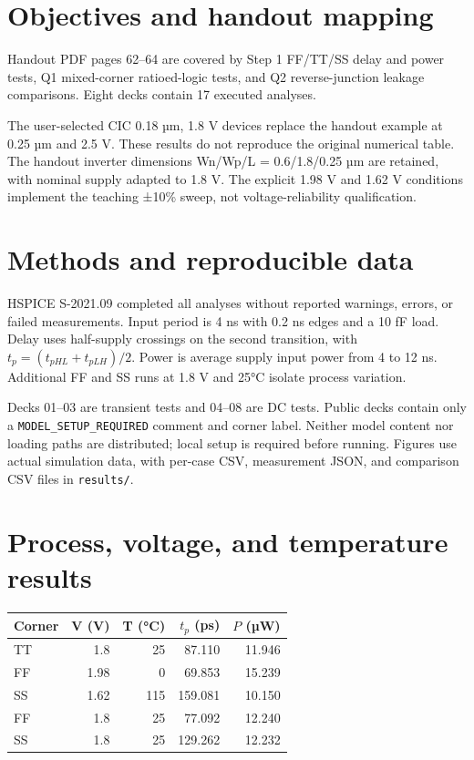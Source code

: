 \section{Objectives and handout mapping}

Handout PDF pages 62--64 are covered by Step 1 FF/TT/SS delay and power tests, Q1 mixed-corner ratioed-logic tests, and Q2 reverse-junction leakage comparisons. Eight decks contain 17 executed analyses.

The user-selected CIC 0.18 µm, 1.8 V devices replace the handout example at 0.25 µm and 2.5 V. These results do not reproduce the original numerical table. The handout inverter dimensions Wn/Wp/L = 0.6/1.8/0.25 µm are retained, with nominal supply adapted to 1.8 V. The explicit 1.98 V and 1.62 V conditions implement the teaching ±10\% sweep, not voltage-reliability qualification.

\section{Methods and reproducible data}

HSPICE S-2021.09 completed all analyses without reported warnings, errors, or failed measurements. Input period is 4 ns with 0.2 ns edges and a 10 fF load. Delay uses half-supply crossings on the second transition, with $t_p=(t_{pHL}+t_{pLH})/2$. Power is average supply input power from 4 to 12 ns. Additional FF and SS runs at 1.8 V and 25°C isolate process variation.

Decks 01--03 are transient tests and 04--08 are DC tests. Public decks contain only a \texttt{MODEL\_SETUP\_REQUIRED} comment and corner label. Neither model content nor loading paths are distributed; local setup is required before running. Figures use actual simulation data, with per-case CSV, measurement JSON, and comparison CSV files in \texttt{results/}.

\section{Process, voltage, and temperature results}

\begin{center}\small
\begin{tabular}{lrrrr}
\toprule
Corner & V (V) & T (°C) & $t_p$ (ps) & $P$ (µW) \\
\midrule
TT & 1.8 & 25 & 87.110 & 11.946 \\
FF & 1.98 & 0 & 69.853 & 15.239 \\
SS & 1.62 & 115 & 159.081 & 10.150 \\
FF & 1.8 & 25 & 77.092 & 12.240 \\
SS & 1.8 & 25 & 129.262 & 12.232 \\
\bottomrule
\end{tabular}
\end{center}

